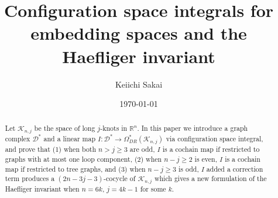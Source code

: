 \documentclass{amsart}
\title[Configuration space integrals and the Haefliger invariant]
{Configuration space integrals for embedding spaces and the Haefliger invariant}
\author{Keiichi Sakai}
\date{\today}
\theoremstyle{plain}
\theoremstyle{definition}
\newcommand{\R}{\mathbb{R}}
\newcommand{\D}{\mathcal{D}}
\newcommand{\emb}[2]{\mathcal{K}_{#1 ,#2}}
\numberwithin{equation}{section}
\numberwithin{figure}{section}
\numberwithin{table}{section}
\begin{document}
\begin{abstract}
Let $\emb{n}{j}$ be the space of long $j$-knots in $\R^n$.
In this paper we introduce a graph complex $\D^*$ and a linear map $I:\D^* \to \Omega^*_{DR}(\emb{n}{j})$ via
configuration space integral, and prove that
(1) when both $n>j\ge 3$ are odd, $I$ is a cochain map if restricted to graphs with at most one loop component,
(2) when $n-j \ge 2$ is even, $I$ is a cochain map if restricted to tree graphs, and
(3) when $n-j \ge 3$ is odd, $I$ added a correction term produces a $(2n-3j-3)$-cocycle of $\emb{n}{j}$ which gives a new
formulation of the Haefliger invariant when $n=6k$, $j=4k-1$ for some $k$.
\end{abstract}

\maketitle










\end{document}

